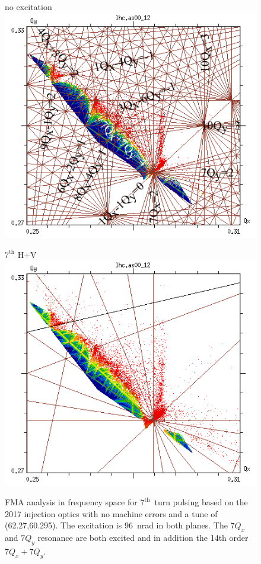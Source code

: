 \documentclass[%
 reprint,
 amsmath,amssymb,
 aps,
prstab,
]{revtex4-1}
\begin{document}
\begin{figure}[h]
	\begin{minipage}[t]{0.49\linewidth}
		\centering
		no excitation
		\includegraphics[width=1.0\linewidth]{2017injnocolc15o+19_6noerru_dp0_ord14_annotate.png}
	\end{minipage}
	\begin{minipage}[t]{0.49\linewidth}
		\centering
		$7^{\mathrm{th}}$ H+V
		\includegraphics[width=1.0\linewidth]{2017injnocolc15o+19_6noerrut7skhv_dp0_ord7.png}
	\end{minipage}	
	\caption{\label{fig:7th2017fma} FMA analysis in frequency space for $7^{\mathrm{th}}$~turn pulsing based on the 2017 injection optics with no machine errors and a tune of (62.27,60.295). The excitation is 96~nrad in both planes. The $7Q_x$ and $7Q_y$ resonance are both excited and in addition the 14th order $7Q_x+7Q_y$.}
\end{figure}
\end{document}
